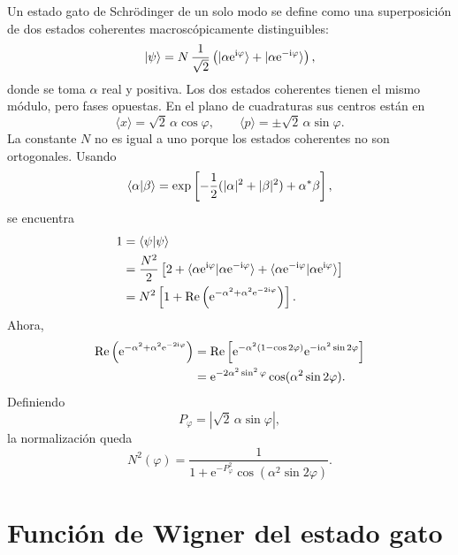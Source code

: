 \documentclass[11pt]{article}
\newcommand{\ii}{\mathrm{i}}
\newcommand{\ee}{\mathrm{e}}
\newcommand{\Real}{\operatorname{Re}}
\begin{document}
Un estado gato de Schr\"odinger de un solo modo se define como una
superposici\'on de dos estados coherentes macrosc\'opicamente distinguibles:
\begin{equation}
  \ket\psi
  =
  N\,\frac{1}{\sqrt2}
  \left(
  \ket{\alpha\ee^{\ii\varphi}}
  +
  \ket{\alpha\ee^{-\ii\varphi}}
  \right),
\end{equation}
donde se toma $\alpha$ real y positiva. Los dos estados coherentes tienen el
mismo m\'odulo, pero fases opuestas. En el plano de cuadraturas sus centros
est\'an en
\begin{equation}
  \langle x\rangle=\sqrt2\,\alpha\cos\varphi,
  \qquad
  \langle p\rangle=\pm\sqrt2\,\alpha\sin\varphi.
\end{equation}
La constante $N$ no es igual a uno porque los estados coherentes no son
ortogonales. Usando
\begin{equation}
  \braket{\alpha|\beta}
  =
  \exp\left[
  -\frac12(|\alpha|^2+|\beta|^2)+\alpha^*\beta
  \right],
\end{equation}
se encuentra
\begin{align}
  1
  &=
  \braket{\psi|\psi} \notag\\
  &=
  \frac{N^2}{2}
  \left[
  2+
  \braket{\alpha\ee^{\ii\varphi}|\alpha\ee^{-\ii\varphi}}
  +
  \braket{\alpha\ee^{-\ii\varphi}|\alpha\ee^{\ii\varphi}}
  \right] \notag\\
  &=
  N^2
  \left[
  1+
  \Real\left(
  \ee^{-\alpha^2+\alpha^2\ee^{-2\ii\varphi}}
  \right)
  \right].
\end{align}
Ahora,
\begin{align}
  \Real\left(
  \ee^{-\alpha^2+\alpha^2\ee^{-2\ii\varphi}}
  \right)
  &=
  \Real\left[
  \ee^{-\alpha^2(1-\cos2\varphi)}
  \ee^{-\ii\alpha^2\sin2\varphi}
  \right] \notag\\
  &=
  \ee^{-2\alpha^2\sin^2\varphi}
  \cos(\alpha^2\sin2\varphi).
\end{align}
Definiendo
\begin{equation}
  P_\varphi=|\sqrt2\,\alpha\sin\varphi|,
\end{equation}
la normalizaci\'on queda
\begin{equation}
  \boxed{
  N^2(\varphi)
  =
  \frac{1}
  {1+\ee^{-P_\varphi^2}\cos(\alpha^2\sin2\varphi)}.
  }
\end{equation}

\section{Funci\'on de Wigner del estado gato}
\end{document}
